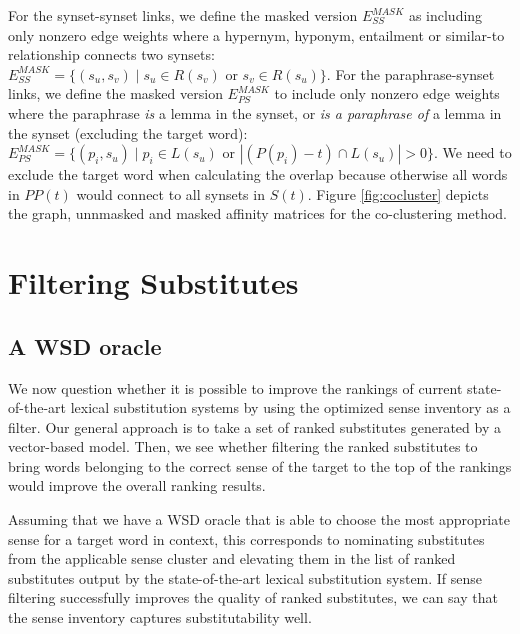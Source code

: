 \documentclass[11pt]{article}
\begin{document}
For the synset-synset links, we define the masked version $E_{SS}^{MASK}$ as including only nonzero edge weights where a hypernym, hyponym, entailment or similar-to relationship connects two synsets: $E_{SS}^{MASK} = \{(s_u, s_v) \mid s_u \in R(s_v) \text{ or } s_v \in R(s_u)\}$. For the paraphrase-synset links, we define the masked version $E_{PS}^{MASK}$ to include only nonzero edge weights where the paraphrase \textit{is} a lemma in the synset, or \textit{is a paraphrase of} a lemma in the synset (excluding the target word): $E_{PS}^{MASK} = \{(p_i, s_u) \mid p_i \in L(s_u) \text{ or } |(P(p_i)-t) \cap L(s_u)| > 0 \}$. We need to exclude the target word when calculating the overlap because otherwise all words in $PP(t)$ would connect to all synsets in $S(t)$. Figure \ref{fig:cocluster} depicts the graph, unnmasked and masked affinity matrices for the co-clustering method. 


\section{Filtering Substitutes}

\subsection{A WSD oracle}

We now question whether it is possible to improve the rankings of current state-of-the-art lexical substitution systems by using the optimized sense inventory as a filter. Our general approach is to take a set of ranked substitutes generated by a vector-based model. Then, we see whether filtering the ranked substitutes to bring words belonging to the correct sense of the target to the top of the rankings would improve the overall ranking results. 

Assuming that we have a WSD oracle that is able to choose the most appropriate sense for a target word in context, this corresponds to nominating substitutes from the applicable sense cluster and elevating them in the list of ranked substitutes output by the state-of-the-art lexical substitution system. 
If sense filtering successfully improves the quality of ranked substitutes, we can say that the sense inventory captures substitutability well. 
\end{document}
